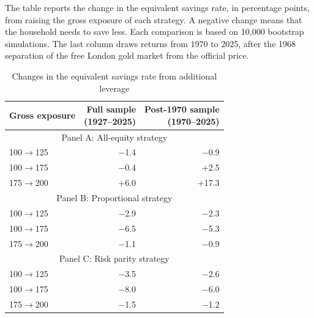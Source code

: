 \begin{table}[p]\centering
\caption{Changes in the equivalent savings rate from additional leverage}\label{tab:exposure-value}
\begin{minipage}{\linewidth}\small The table reports the change in the equivalent savings rate, in percentage points, from raising the gross exposure of each strategy. A negative change means that the household needs to save less. Each comparison is based on 10,000 bootstrap simulations. The last column draws returns from 1970 to 2025, after the 1968 separation of the free London gold market from the official price.\end{minipage}
\medskip

{\setlength{\tabcolsep}{4pt}\small
\begin{tabular}{lrr}\toprule
Gross exposure & \shortstack{Full sample\\ (1927--2025)} & \shortstack{Post-1970 sample\\ (1970--2025)} \\ \midrule
\multicolumn{3}{c}{Panel A: All-equity strategy} \\
100$\to$125 & $-$1.4 & $-$0.9 \\
100$\to$175 & $-$0.4 & +2.5 \\
175$\to$200 & +6.0 & +17.3 \\
\midrule
\multicolumn{3}{c}{Panel B: Proportional strategy} \\
100$\to$125 & $-$2.9 & $-$2.3 \\
100$\to$175 & $-$6.5 & $-$5.3 \\
175$\to$200 & $-$1.1 & $-$0.9 \\
\midrule
\multicolumn{3}{c}{Panel C: Risk parity strategy} \\
100$\to$125 & $-$3.5 & $-$2.6 \\
100$\to$175 & $-$8.0 & $-$6.0 \\
175$\to$200 & $-$1.5 & $-$1.2 \\
\bottomrule\end{tabular}}
\end{table}
